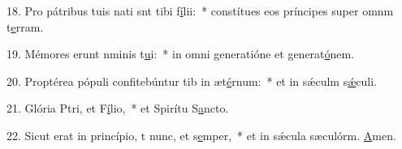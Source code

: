 18. Pro pátribus tuis nati snt tibi f\uline{í}lii:~* constítues eos príncipes super omnm t\uline{e}rram.\par 
19. Mémores erunt nminis t\uline{u}i:~* in omni generatióne et generat\uline{ó}nem.\par 
20. Proptérea pópuli confitebúntur tib in æt\uline{é}rnum:~* et in sǽculm s\uline{ǽ}culi.\par 
21. Glória Ptri, et F\uline{í}lio,~* et Spirítu S\uline{a}ncto.\par 
22. Sicut erat in princípio, t nunc, et s\uline{e}mper,~* et in sǽcula sæculórm. \uline{A}men.\par 

